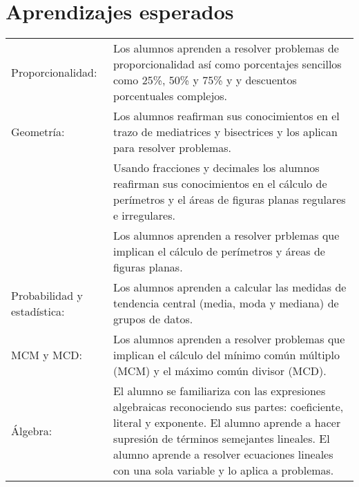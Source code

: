 \documentclass[letterpaper,10pt]{article}
\begin{document}
\newpage

\section{Aprendizajes esperados}
\begin{tabular}[t]{R{0.25\textwidth}p{0.71\textwidth}}
Proporcionalidad: 
                & Los alumnos aprenden a resolver problemas de
                proporcionalidad as\'i como porcentajes sencillos como 25\%, 50\%
                y 75\% y y descuentos porcentuales complejos. \\

Geometr\'ia:    & Los alumnos reafirman sus conocimientos en el trazo de mediatrices
                y bisectrices y los aplican para resolver problemas. \\
                & Usando fracciones y decimales los alumnos reafirman sus
                conocimientos en el c\'alculo de  
                per\'imetros y el \'areas de figuras planas regulares e 
                irregulares. \\
                & Los alumnos aprenden a resolver prblemas que implican el
                c\'alculo de per\'imetros y \'areas de figuras planas. \\
Probabilidad y estad\'istica:
                & Los alumnos aprenden a calcular las medidas de tendencia 
                central (media, moda y mediana) de grupos de datos. \\
MCM y MCD: &    Los alumnos aprenden a resolver problemas que implican el 
                c\'alculo del m\'inimo com\'un m\'ultiplo (MCM) y el m\'aximo 
                com\'un divisor (MCD). \\
\'Algebra: &    El alumno se familiariza con las expresiones 
                algebraicas reconociendo sus partes: coeficiente, literal y
                exponente. El alumno aprende a hacer supresi\'on de t\'erminos
                semejantes lineales. El alumno aprende a resolver ecuaciones
                lineales con una sola variable y lo aplica a problemas.
\end{tabular}
\end{document}
